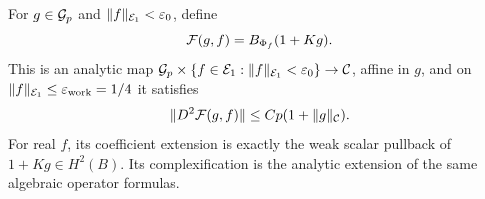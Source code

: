 \begin{proposition}
\label{inf:nonlinear-map}
For $g\in\mathcal{G}_p$ and $\lVert f\rVert_{\mathcal E_1}<\varepsilon_0$, define
\begin{equation}\label{inf:nonlinear-definition}
 \mathcal F(g,f)=B_{\Phi_f}(1+Kg).
\end{equation}
This is an analytic map
$\mathcal{G}_p\times\{f\in\mathcal E_1:\lVert f\rVert_{\mathcal E_1}<\varepsilon_0\}\to\mathcal C$,
affine in $g$,
and on $\lVert f\rVert_{\mathcal E_1}\le\varepsilon_{\mathrm{work}}=1/4$ it satisfies
\begin{equation}\label{inf:nonlinear-second}
 \lVert D^2\mathcal F(g,f)\rVert\le Cp(1+\lVert g\rVert_\mathcal C).
\end{equation}
For real $f$, its coefficient extension is exactly the weak scalar
pullback of $1+Kg\in H^2(B)$. Its complexification is the analytic
extension of the same algebraic operator formulas.
\end{proposition}
